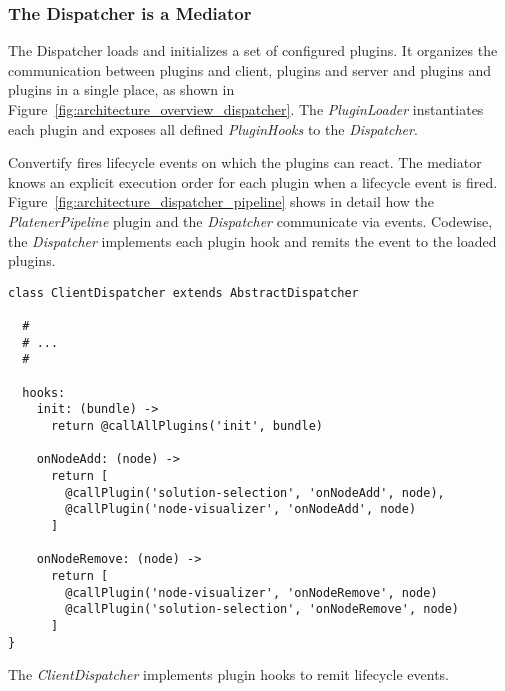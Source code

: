 \documentclass[../ClassicThesis.tex]{subfiles}
\begin{document}
\subsubsection{The Dispatcher is a Mediator}

The Dispatcher loads and initializes a set of configured plugins. It organizes
the communication between plugins and client, plugins and server and plugins and
plugins in a single place, as shown in
Figure~\ref{fig:architecture_overview_dispatcher}. The \emph{PluginLoader}
instantiates each plugin and exposes all defined \emph{PluginHooks} to the
\emph{Dispatcher}. 



Convertify fires lifecycle events on which the plugins can react. The mediator
knows an explicit execution order for each plugin when a lifecycle event is
fired. Figure~\ref{fig:architecture_dispatcher_pipeline} shows in detail how the
\emph{PlatenerPipeline} plugin and the \emph{Dispatcher} communicate via events.
Codewise, the \emph{Dispatcher} implements each plugin hook and remits the event
to the loaded plugins.

\begin{listing}[!h]
\centering
\begin{verbatim}
class ClientDispatcher extends AbstractDispatcher

  #
  # ...
  #

  hooks:
    init: (bundle) ->
      return @callAllPlugins('init', bundle)

    onNodeAdd: (node) ->
      return [
        @callPlugin('solution-selection', 'onNodeAdd', node),
        @callPlugin('node-visualizer', 'onNodeAdd', node)
      ]

    onNodeRemove: (node) ->
      return [
        @callPlugin('node-visualizer', 'onNodeRemove', node)
        @callPlugin('solution-selection', 'onNodeRemove', node)
      ]
}
\end{verbatim}
\caption{The \emph{ClientDispatcher} implements plugin hooks to remit lifecycle events.}
\label{lst:client-disp-hooks}
\end{listing}
\end{document}
